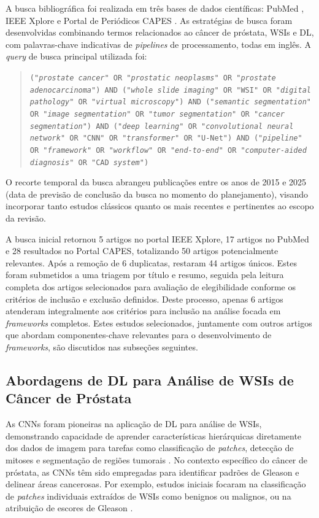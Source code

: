 A busca bibliográfica foi realizada em três bases de dados científicas: PubMed \cite{PubMed2024}, IEEE Xplore \cite{IEEEXplore2024}  e Portal de Periódicos CAPES \cite{PeriodicosCAPES2024}. As estratégias de busca foram desenvolvidas combinando termos relacionados ao câncer de próstata, WSIs e DL, com palavras-chave indicativas de \textit{pipelines} de processamento, todas em inglês. A \textit{query} de busca principal utilizada foi:
\begin{quote}
\texttt{("\textit{prostate cancer}" OR "\textit{prostatic neoplasms}" OR "\textit{prostate adenocarcinoma}") AND ("\textit{whole slide imaging}" OR "WSI" OR "\textit{digital pathology}" OR "\textit{virtual microscopy}") AND ("\textit{semantic segmentation}" OR "\textit{image segmentation}" OR "\textit{tumor segmentation}" OR "\textit{cancer segmentation}") AND ("\textit{deep learning}" OR "\textit{convolutional neural network}" OR "CNN" OR "\textit{transformer}" OR "U-Net") AND ("\textit{pipeline}" OR "\textit{framework}" OR "\textit{workflow}" OR "\textit{end-to-end}" OR "\textit{computer-aided diagnosis}" OR "CAD \textit{system}")}
\end{quote}
O recorte temporal da busca abrangeu publicações entre os anos de 2015 e 2025 (data de previsão de conclusão da busca no momento do planejamento), visando incorporar tanto estudos clássicos quanto os mais recentes e pertinentes ao escopo da revisão.

A busca inicial retornou 5 artigos no portal IEEE Xplore, 17 artigos no PubMed e 28 resultados no Portal CAPES, totalizando 50 artigos potencialmente relevantes. Após a remoção de 6 duplicatas, restaram 44 artigos únicos. Estes foram submetidos a uma triagem por título e resumo, seguida pela leitura completa dos artigos selecionados para avaliação de elegibilidade conforme os critérios de inclusão e exclusão definidos. Deste processo, apenas 6 artigos atenderam integralmente aos critérios para inclusão na análise focada em \textit{frameworks} completos. Estes estudos selecionados, juntamente com outros artigos que abordam componentes-chave relevantes para o desenvolvimento de \textit{frameworks}, são discutidos nas subseções seguintes.

\subsection{Abordagens de DL para Análise de WSIs de Câncer de Próstata}\label{subsec:dl_abordagens_wsi}

As CNNs foram pioneiras na aplicação de DL para análise de WSIs, demonstrando capacidade de aprender características hierárquicas diretamente dos dados de imagem para tarefas como classificação de \textit{patches}, detecção de mitoses e segmentação de regiões tumorais \cite{Ciresan2012, Litjens2017}. No contexto específico do câncer de próstata, as CNNs têm sido empregadas para identificar padrões de Gleason e delinear áreas cancerosas. Por exemplo, estudos iniciais focaram na classificação de \textit{patches} individuais extraídos de WSIs como benignos ou malignos, ou na atribuição de escores de Gleason \cite{Bulten2022}. %

